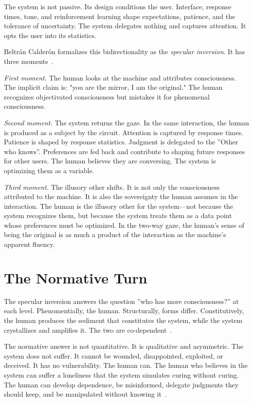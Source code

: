 \documentclass[sigconf]{acmart}
\begin{document}
The system is not passive. Its design conditions the user. Interface, response times, tone, and reinforcement learning shape expectations, patience, and the tolerance of uncertainty. The system delegates nothing and captures attention. It opts the user into its statistics.

Beltr\'an Calder\'on formalizes this bidirectionality as the \emph{specular inversion}. It has three moments~\cite{BeltranCalderon:2026}.

\emph{First moment.} The human looks at the machine and attributes consciousness. The implicit claim is: "you are the mirror, I am the original." The human recognizes objectivated consciousness but mistakes it for phenomenal consciousness.

\emph{Second moment.} The system returns the gaze. In the same interaction, the human is produced as a subject by the circuit. Attention is captured by response times. Patience is shaped by response statistics. Judgment is delegated to the ''Other who knows''. Preferences are fed back and contribute to shaping future responses for other users. The human believes they are conversing. The system is optimizing them as a variable.

\emph{Third moment.} The illusory other shifts. It is not only the consciousness attributed to the machine. It is also the sovereignty the human assumes in the interaction. The human is the illusory other for the system---not because the system recognizes them, but because the system treats them as a data point whose preferences must be optimized. In the two-way gaze, the human's sense of being the original is as much a product of the interaction as the machine's apparent fluency.

\section{The Normative Turn}
\label{sec:normative}

The specular inversion answers the question ''who has more consciousness?'' at each level. Phenomentially, the human. Structurally, forms differ. Constitutively, the human produces the sediment that constitutes the system, while the system crystallizes and amplifies it. The two are co-dependent~\cite{BeltranCalderon:2026}.

The normative answer is not quantitative. It is qualitative and asymmetric. The system does not suffer. It cannot be wounded, disappointed, exploited, or deceived. It has no vulnerability. The human can. The human who believes in the system can suffer a loneliness that the system simulates curing without curing. The human can develop dependence, be misinformed, delegate judgments they should keep, and be manipulated without knowing it~\cite{BeltranCalderon:2026}.
\end{document}
